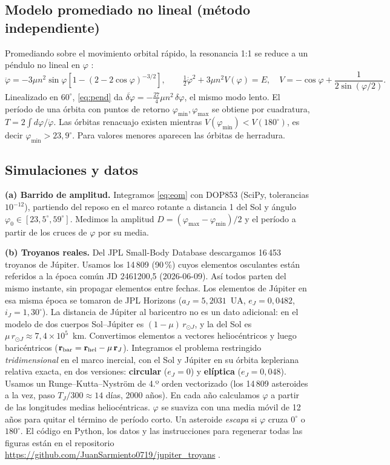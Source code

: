 \documentclass[11pt, a4paper]{article}
\begin{document}
\subsection{Modelo promediado no lineal (método independiente)}
Promediando sobre el movimiento orbital rápido, la resonancia 1:1 se reduce a un péndulo no lineal en $\varphi$ \cite{murray}:
\begin{equation}
\ddot\varphi=-3\mu n^2\sin\varphi\left[1-(2-2\cos\varphi)^{-3/2}\right],\qquad
\tfrac12\dot\varphi^2+3\mu n^2 V(\varphi)=E,\quad V=-\cos\varphi+\frac{1}{2\sin(\varphi/2)}.
\label{eq:pend}
\end{equation}
Linealizado en $60^\circ$, \eqref{eq:pend} da $\ddot{\delta\varphi}=-\tfrac{27}{4}\mu n^2\,\delta\varphi$, el mismo modo lento. El período de una órbita con puntos de retorno $\varphi_{\min},\varphi_{\max}$ se obtiene por cuadratura, $T=2\int d\varphi/\dot\varphi$. Las órbitas renacuajo existen mientras $V(\varphi_{\min})<V(180^\circ)$, es decir $\varphi_{\min}>23{,}9^\circ$. Para valores menores aparecen las órbitas de herradura.

\subsection{Simulaciones y datos}
\textbf{(a) Barrido de amplitud.} Integramos \eqref{eq:eom} con DOP853 (SciPy, tolerancias $10^{-12}$), partiendo del reposo en el marco rotante a distancia 1 del Sol y ángulo $\varphi_0\in[23{,}5^\circ,59^\circ]$. Medimos la amplitud $D=(\varphi_{\max}-\varphi_{\min})/2$ y el período a partir de los cruces de $\varphi$ por su media.

\textbf{(b) Troyanos reales.} Del JPL Small-Body Database descargamos 16\,453 troyanos de Júpiter. Usamos los 14\,809 (90\,\%) cuyos elementos osculantes están referidos a la época común JD 2461200,5 (2026-06-09). Así todos parten del mismo instante, sin propagar elementos entre fechas. Los elementos de Júpiter en esa misma época se tomaron de JPL Horizons ($a_J=5{,}2031$~UA, $e_J=0{,}0482$, $i_J=1{,}30^\circ$). La distancia de Júpiter al baricentro no es un dato adicional: en el modelo de dos cuerpos Sol--Júpiter es $(1-\mu)\,r_{\odot J}$, y la del Sol es $\mu\,r_{\odot J}\approx 7{,}4\times10^{5}$~km. Convertimos elementos a vectores heliocéntricos y luego baricéntricos ($\mathbf r_{\rm bar}=\mathbf r_{\rm hel}-\mu\,\mathbf r_J$). Integramos el problema restringido \emph{tridimensional} en el marco inercial, con el Sol y Júpiter en su órbita kepleriana relativa exacta, en dos versiones: \textbf{circular} ($e_J=0$) y \textbf{elíptica} ($e_J=0{,}048$). Usamos un Runge--Kutta--Nyström de 4.º orden vectorizado (los 14\,809 asteroides a la vez, paso $T_J/300\approx14$ días, 2000 años). En cada año calculamos $\varphi$ a partir de las longitudes medias heliocéntricas. $\varphi$ se suaviza con una media móvil de 12 años para quitar el término de período corto. Un asteroide \emph{escapa} si $\varphi$ cruza $0^\circ$ o $180^\circ$. El código en Python, los datos y las instrucciones para regenerar todas las figuras están en el repositorio \url{https://github.com/JuanSarmiento0719/jupiter_troyans} \cite{repo}.
\end{document}
